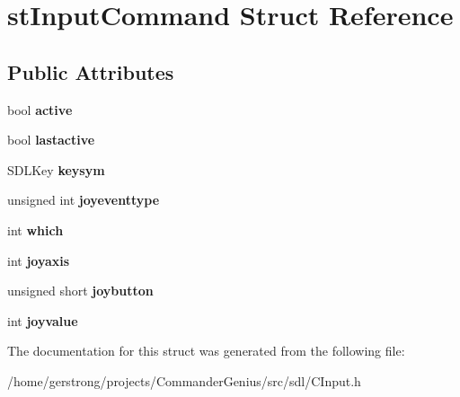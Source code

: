 \hypertarget{structst_input_command}{
\section{stInputCommand Struct Reference}
\label{structst_input_command}
}
\subsection*{Public Attributes}
\begin{DoxyCompactItemize}
\item 
\hypertarget{structst_input_command_a3076580d22e4ac23ec08bd291e58e3a0}{
bool {\bfseries active}}
\label{structst_input_command_a3076580d22e4ac23ec08bd291e58e3a0}

\item 
\hypertarget{structst_input_command_ad398f116846be0228b4589cdcbcff5c9}{
bool {\bfseries lastactive}}
\label{structst_input_command_ad398f116846be0228b4589cdcbcff5c9}

\item 
\hypertarget{structst_input_command_a842129a9df5708d3922fb9f2ee575e61}{
SDLKey {\bfseries keysym}}
\label{structst_input_command_a842129a9df5708d3922fb9f2ee575e61}

\item 
\hypertarget{structst_input_command_a95e152b0523068d02e6291076c222b53}{
unsigned int {\bfseries joyeventtype}}
\label{structst_input_command_a95e152b0523068d02e6291076c222b53}

\item 
\hypertarget{structst_input_command_a87635b4b5ca12d69cb1845e2ddf27e83}{
int {\bfseries which}}
\label{structst_input_command_a87635b4b5ca12d69cb1845e2ddf27e83}

\item 
\hypertarget{structst_input_command_aea08104d136bd606059d2acd4b8b167d}{
int {\bfseries joyaxis}}
\label{structst_input_command_aea08104d136bd606059d2acd4b8b167d}

\item 
\hypertarget{structst_input_command_ac2acd19ec70229b8f34141cb84a7f88e}{
unsigned short {\bfseries joybutton}}
\label{structst_input_command_ac2acd19ec70229b8f34141cb84a7f88e}

\item 
\hypertarget{structst_input_command_a7694f6861ea2efef1f72e636e8a183e0}{
int {\bfseries joyvalue}}
\label{structst_input_command_a7694f6861ea2efef1f72e636e8a183e0}

\end{DoxyCompactItemize}


The documentation for this struct was generated from the following file:\begin{DoxyCompactItemize}
\item 
/home/gerstrong/projects/CommanderGenius/src/sdl/CInput.h\end{DoxyCompactItemize}
